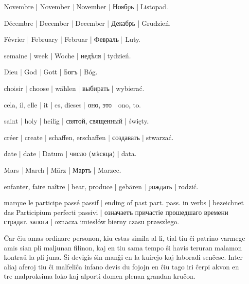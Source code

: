 \begin{ekzvocab}{1em}
 Novembre | November | November | Ноябрь | Listopad.

 Décembre | December | December | Декабрь | Grudzień.

 Février | February | Februar | Февраль | Luty.

 semaine | week | Woche | недѣля | tydzień.

 Dieu | God | Gott | Богъ | Bóg.

 choisir | choose | wählen | выбирать | wybierać.

 cela, il, elle | it | es, dieses | оно, это | ono, to.

 saint | holy | heilig | святой, священный | święty.

 créer | create | schaffen, erschaffen | создавать | stwarzać.

 date | date | Datum | число (мѣсяца) | data.

 Mars | March | März | Мартъ | Marzec.

 enfanter, faire naître | bear, produce | gebären | рождать | rodzić.

 marque le participe passé passif | ending of past part. pass. in verbs | bezeichnet das Participium perfecti passivi | означаетъ причастіе прошедшаго времени страдат. залога | oznacza imiesłów bierny czasu przeszłego.

\end{ekzvocab}



Ĉar ĉiu amas ordinare personon, kiu estas simila al li, tial tiu ĉi patrino varmege amis sian pli maljunan filinon, kaj en tiu sama tempo ŝi havis teruran malamon kontraŭ la pli juna. Ŝi devigis ŝin manĝi en la kuirejo kaj laboradi senĉese. Inter aliaj aferoj tiu ĉi malfeliĉa infano devis du fojojn en ĉiu tago iri ĉerpi akvon en tre malproksima loko kaj alporti domen plenan grandan kruĉon.

